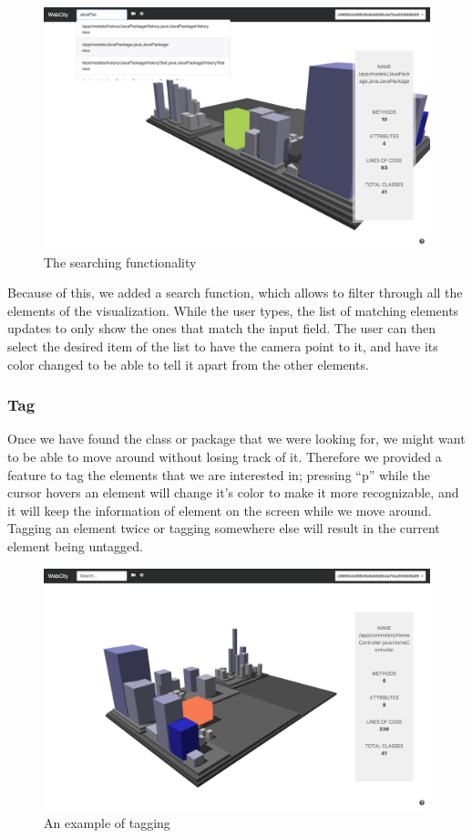 \documentclass[]{usiinfbachelorproject}
\begin{document}
\begin{figure} [H]
\centering
\includegraphics[width=1\textwidth]{pictures/search.png}
\caption{The searching functionality}
\label{fig:search}
\end{figure}


Because of this, we added a search function, which allows to filter through all the elements of the visualization. While the user types,
the list of matching elements updates to only show the ones that match the input field. The user can then select the desired item of the list to have the camera point to it,
and have its color changed to be able to tell it apart from the other elements.

\subsubsection{Tag} \label{Tag}
Once we have found the class or package that we were looking for, we might want to be able to move around without losing track of it. Therefore we provided a feature to tag the elements
that we are interested in; pressing ``p'' while the cursor hovers an element will change it's color to make it more recognizable, and it will keep the information of element on the screen
while we move around. Tagging an element twice or tagging somewhere else will result in the current element being untagged.

\begin{figure} [H]
\centering
\includegraphics[width=1\textwidth]{pictures/tag.png}
\caption{An example of tagging}
\label{fig:tag}
\end{figure}
\end{document}
